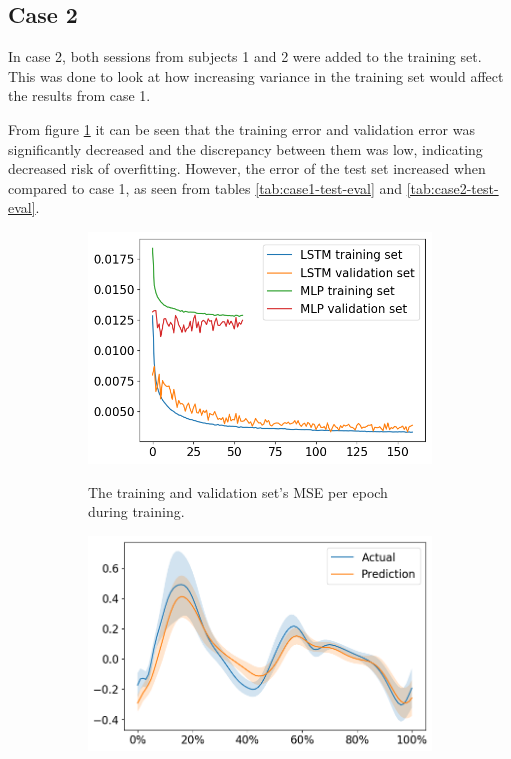 \documentclass[../main.tex]{subfiles}
\begin{document}
\subsection{Case 2}
\label{sec:results-case2}
In case 2, both sessions from subjects 1 and 2 were added to the training set.
This was done to look at how increasing variance in the training set would affect the results from case 1.

From figure \ref{fig:case2-training-performance} it can be seen that the training error and validation error was significantly decreased and the discrepancy between them was low, indicating decreased risk of overfitting.
However, the error of the test set increased when compared to case 1, as seen from tables \ref{tab:case1-test-eval} and \ref{tab:case2-test-eval}.
\begin{figure}[ht!]
    \captionsetup[subfigure]{aboveskip=-12pt}
     \centering
     \begin{subfigure}[b]{0.475\textwidth}
         \centering
         \includegraphics[width=\textwidth]{img/results/training_history/Case2_LSTMvsMLP_training.png}
         \label{fig:case2-training-performance}
         \caption{The training and validation set's \ac{MSE} per epoch during training.}
     \end{subfigure}
     \hfill
     \begin{subfigure}[b]{0.515\textwidth}
         \centering
         \includegraphics[width=\textwidth]{img/results/test_prediction_evaluation/Case2_LSTM_test_prediction.png}

\end{subfigure}
\end{figure}
\end{document}
